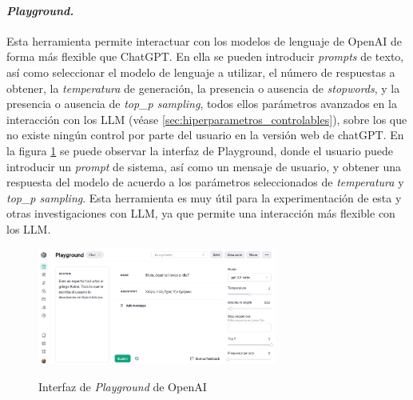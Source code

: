         \paragraph{\emph{Playground.}} Esta herramienta permite interactuar con los modelos de lenguaje de OpenAI de forma más flexible que ChatGPT. En ella se pueden introducir \emph{prompts} de texto, así como seleccionar el modelo de lenguaje a utilizar, el número de respuestas a obtener, la \emph{temperatura} de generación, la presencia o ausencia de \emph{stopwords}, y la presencia o ausencia de \emph{top\_p sampling}, todos ellos parámetros avanzados en la interacción con los LLM (véase \ref{sec:hiperparametros_controlables}), sobre los que no existe ningún control por parte del usuario en la versión web de chatGPT. En la figura \ref{fig:playground} se puede observar la interfaz de Playground, donde el usuario puede introducir un \emph{prompt} de sistema, así como un mensaje de usuario, y obtener una respuesta del modelo de acuerdo a los parámetros seleccionados de \emph{temperatura} y \emph{top\_p sampling}. Esta herramienta es muy útil para la experimentación de esta y otras investigaciones con LLM, ya que permite una interacción más flexible con los LLM.

        \begin{figure}[h]
            \caption[Interfaz de \emph{Playground} de OpenAI]{Interfaz de \emph{Playground} de OpenAI}
            \centering
            \includegraphics[width=0.7\textwidth]{./figuras/interfaz_playground.png}
            \source{\propio}
            \label{fig:playground}
        \end{figure}

